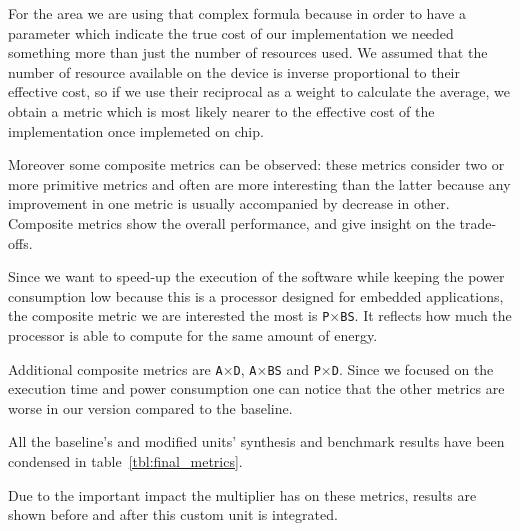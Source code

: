 For the area we are using that complex formula because in order to have a parameter which indicate the true cost of our implementation we needed something more than just the number of resources used.
We assumed that the number of resource available on the device is inverse proportional to their effective cost, so if we use their reciprocal as a weight to calculate the average, we obtain a metric which is most likely nearer to the effective cost of the implementation once implemeted on chip.

Moreover some composite metrics can be observed: these metrics consider two or more primitive
metrics and often are more interesting than the latter because any improvement in one metric is usually accompanied by decrease in other. Composite metrics show the overall performance, and give insight on the trade-offs.

Since we want to speed-up the execution of the software while keeping the power consumption
low because this is a processor designed for embedded applications, the composite metric we are
interested the most is \texttt{P$\times$BS}. It reflects how much the processor is able to compute for the same amount of energy.

Additional composite metrics are \texttt{A$\times$D}, \texttt{A$\times$BS} and \texttt{P$\times$D}. Since we focused on the
execution time and power consumption one can notice that the other metrics are worse in our version
compared to the baseline.

All the baseline's and modified units' synthesis and benchmark results have been condensed in table~\ref{tbl:final_metrics}.

 Due to the important impact the multiplier has on these metrics, results are shown before and after this custom unit is integrated.

